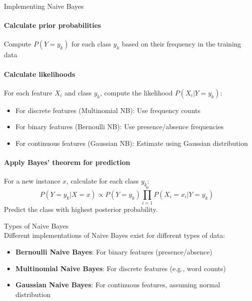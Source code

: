 \begin{KR}{Implementing Naive Bayes}\\
\paragraph{Calculate prior probabilities}
Compute $P(Y=y_k)$ for each class $y_k$ based on their frequency in the training data

\paragraph{Calculate likelihoods}
For each feature $X_i$ and class $y_k$, compute the likelihood $P(X_i|Y=y_k)$:
\begin{itemize}
    \item For discrete features (Multinomial NB): Use frequency counts
    \item For binary features (Bernoulli NB): Use presence/absence frequencies
    \item For continuous features (Gaussian NB): Estimate using Gaussian distribution
\end{itemize}

\paragraph{Apply Bayes' theorem for prediction}
For a new instance $x$, calculate for each class $y_k$:
\[P(Y=y_k|X=x) \propto P(Y=y_k) \prod_{i=1}^{n} P(X_i=x_i|Y=y_k)\]
Predict the class with highest posterior probability.
\end{KR}

\begin{definition}{Types of Naive Bayes}\\
Different implementations of Naive Bayes exist for different types of data:
\begin{itemize}
    \item \textbf{Bernoulli Naive Bayes}: For binary features (presence/absence)
    \item \textbf{Multinomial Naive Bayes}: For discrete features (e.g., word counts)
    \item \textbf{Gaussian Naive Bayes}: For continuous features, assuming normal distribution
\end{itemize}
\end{definition}

